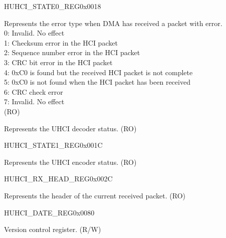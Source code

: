 \begin{register}{H}{UHCI\_STATE0\_REG}{0x0018}\label{regdesc:UHCISTATE0REG}
%
%
%
\regnewline%
\begin{regdesc}\begin{reglist}
\label{fielddesc:UHCIRXERRCAUSE}\item [UHCI\_RX\_ERR\_CAUSE] Represents the error type when DMA has received a packet with error.\\
0: Invalid. No effect\\
1: Checksum error in the HCI packet\\
2: Sequence number error in the HCI packet\\
3: CRC bit error in the HCI packet\\
4: 0xC0 is found but the received HCI packet is not complete\\
5: 0xC0 is not found when the HCI packet has been received\\
6: CRC check error\\
7: Invalid. No effect\\(RO)
\label{fielddesc:UHCIDECODESTATE}\item [UHCI\_DECODE\_STATE] Represents the UHCI decoder status. (RO)
\end{reglist}\end{regdesc}
\end{register}


\begin{register}{H}{UHCI\_STATE1\_REG}{0x001C}\label{regdesc:UHCISTATE1REG}
%
%
\regnewline%
\begin{regdesc}\begin{reglist}
\label{fielddesc:UHCIENCODESTATE}\item [UHCI\_ENCODE\_STATE] Represents the UHCI encoder status. (RO)
\end{reglist}\end{regdesc}
\end{register}


\begin{register}{H}{UHCI\_RX\_HEAD\_REG}{0x002C}\label{regdesc:UHCIRXHEADREG}
%
\regnewline%
\begin{regdesc}\begin{reglist}
\label{fielddesc:UHCIRXHEAD}\item [UHCI\_RX\_HEAD] Represents the header of the current received packet. (RO)
\end{reglist}\end{regdesc}
\end{register}


\begin{register}{H}{UHCI\_DATE\_REG}{0x0080}\label{regdesc:UHCIDATEREG}
%
\regnewline%
\begin{regdesc}\begin{reglist}
\label{fielddesc:UHCIDATE}\item [UHCI\_DATE] Version control register. (R/W)
\end{reglist}\end{regdesc}
\end{register}